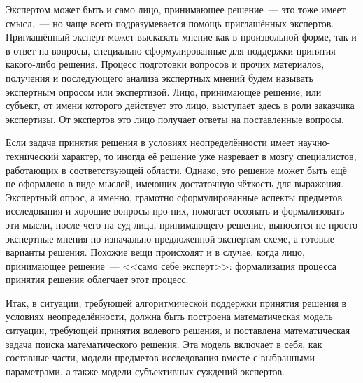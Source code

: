 Экспертом может быть и само лицо, принимающее решение~--- это тоже имеет смысл,~--- но чаще всего подразумевается помощь приглашённых экспертов.  Приглашённый эксперт может высказать мнение как в произвольной форме, так и в ответ на вопросы, специально сформулированные для поддержки принятия какого-либо решения. Процесс подготовки вопросов и прочих материалов, получения и последующего анализа экспертных мнений будем называть экспертным опросом или  экспертизой. Лицо, принимающее решение, или субъект, от имени которого действует это лицо, выступает здесь в роли заказчика экспертизы. От экспертов это лицо получает ответы на поставленные вопросы.

\noticeheader
\begin{notice}
Если задача принятия решения в условиях неопределённости имеет научно-технический характер, то иногда её решение уже назревает в мозгу специалистов, работающих в соответствующей области. Однако, это решение может быть ещё не оформлено в виде мыслей, имеющих достаточную чёткость для выражения. Экспертный опрос, а именно, грамотно сформулированные аспекты предметов исследования и хорошие вопросы про них, помогает осознать и формализовать эти мысли, после чего на суд лица, принимающего решение, выносятся не просто экспертные мнения по изначально предложенной экспертам схеме, а готовые варианты решения. Похожие вещи происходят и в случае, когда лицо, принимающее решение~--- <<само себе эксперт>>: формализация процесса принятия решения облегчает этот процесс. 
\end{notice}

Итак, в ситуации, требующей алгоритмической поддержки принятия решения в условиях неопределённости, должна быть построена математическая модель ситуации, требующей принятия волевого решения, и поставлена математическая задача поиска математического решения. Эта модель включает в себя, как составные части, модели предметов исследования вместе с выбранными параметрами, а также модели субъективных суждений экспертов.
 

